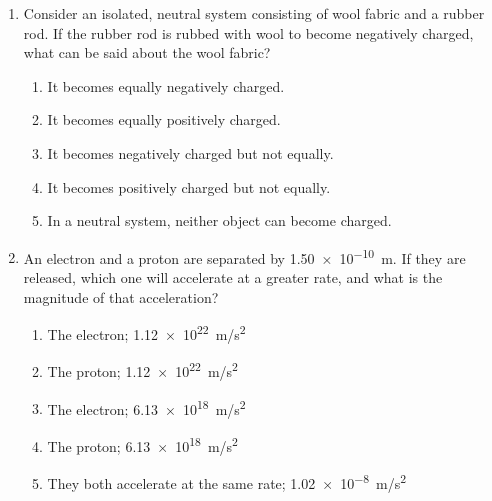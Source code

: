 \documentclass[12pt]{article}
\begin{document}
\begin{enumerate}[leftmargin=50pt,label=\underline{\hspace{0.4in}} \arabic*.]
\item Consider an isolated, neutral system consisting of wool fabric and a
  rubber rod. If the rubber rod is rubbed with wool to become negatively
  charged, what can be said about the wool fabric?
  \begin{enumerate}[noitemsep,topsep=0pt,leftmargin=18pt]
  \item It becomes equally negatively charged.
  \item It becomes equally positively charged.
  \item It becomes negatively charged but not equally.
  \item It becomes positively charged but not equally.
  \item In a neutral system, neither object can become charged.
  \end{enumerate}

\item An electron and a proton are separated by \SI{1.50e-10}{m}. If they are
  released, which one will accelerate at a greater rate, and what is the
  magnitude of that acceleration?
  \begin{enumerate}[noitemsep,topsep=0pt,leftmargin=18pt]
  \item The electron; \SI{1.12e22}{m/s^2}
  \item The proton; \SI{1.12e22}{m/s^2}
  \item The electron; \SI{6.13e18}{m/s^2}
  \item The proton; \SI{6.13e18}{m/s^2}
  \item They both accelerate at the same rate; \SI{1.02e-8}{m/s^2}
  \end{enumerate}


\end{enumerate}
\end{document}
